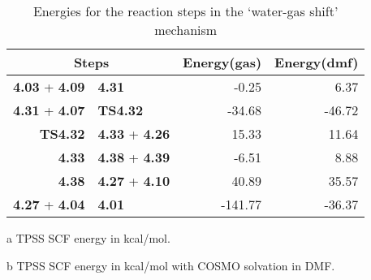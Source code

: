 \begin{table}[!htb]
\centering
 \begin{threeparttable}
  \caption{Energies for the reaction steps in the `water-gas shift' mechanism}
    \begin{tabular}{r@{ $\rightarrow$ }lrr}
    \toprule
    \multicolumn{2}{c}{Steps} & Energy(gas)\tnote{a} & Energy(dmf)\tnote{b} \\
    \midrule
    \textbf{4.03} + \textbf{4.09} & \textbf{4.31} & -0.25 & 6.37 \\
    \textbf{4.31} + \textbf{4.07} & \textbf{TS4.32} & -34.68 & -46.72 \\
    \textbf{TS4.32} & \textbf{4.33} + \textbf{4.26} & 15.33 & 11.64 \\
    \textbf{4.33} & \textbf{4.38} + \textbf{4.39} & -6.51 & 8.88 \\
    \textbf{4.38} & \textbf{4.27} + \textbf{4.10} & 40.89 & 35.57 \\
    \textbf{4.27} + \textbf{4.04} & \textbf{4.01} & -141.77 & -36.37 \\
    \bottomrule
    \end{tabular}%
    \begin{tablenotes}
    \item [a] TPSS SCF energy in kcal/mol.
    \item [b] TPSS SCF energy in kcal/mol with COSMO solvation in DMF.
    \end{tablenotes}
  \label{tab.wgsrxn}%
 \end{threeparttable}
\end{table}%


